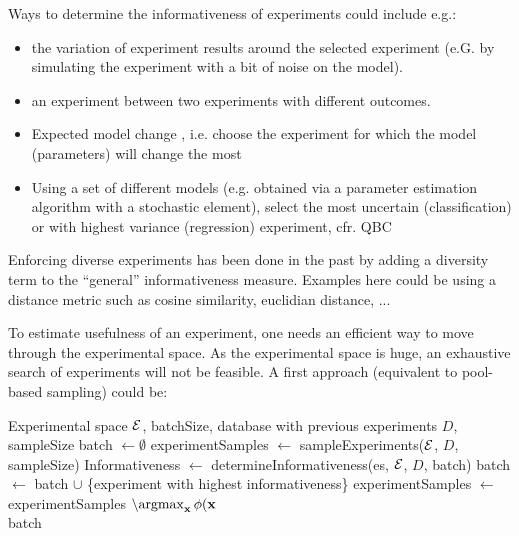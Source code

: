 \documentclass{article}
\begin{document}
Ways to determine the informativeness of experiments could include e.g.:
\begin{itemize}
\item the variation of experiment results around the selected experiment (e.G. by simulating the experiment with a bit of noise on the model).
\item an experiment between two experiments with different outcomes.
\item Expected model change \cite{cai2013maximizing}, i.e. choose the experiment for which the model (parameters) will change the most
\item Using a set of different models (e.g. obtained via a parameter estimation algorithm with a stochastic element), select the most uncertain (classification) or with highest variance (regression) experiment, cfr. QBC
\end{itemize}
Enforcing diverse experiments has been done in the past \cite{xu2007incorporating} by adding a diversity term to the ``general'' informativeness measure. Examples here could be using a distance metric such as cosine similarity, euclidian distance, ...
 
To estimate usefulness of an experiment, one needs an efficient way to 
move through the experimental space. As the experimental space is huge, an exhaustive search of experiments will not be feasible. A first approach (equivalent to pool-based sampling) could be:

\setlength{\textfloatsep}{10pt}%

\begin{algorithmic}
\Require Experimental space $\mathcal{E}$, batchSize, database with previous experiments $D$, sampleSize
\State batch $\leftarrow \emptyset$
\State experimentSamples $\leftarrow$ sampleExperiments($\mathcal{E}$, $D$, sampleSize)
     \State Informativeness $\leftarrow$ determineInformativeness(es, $\mathcal{E}$, $D$, batch)
   \EndFor
   \State batch $\leftarrow$ batch $\cup$ \{experiment with highest informativeness\}
   \State experimentSamples $\leftarrow$ experimentSamples $\setminus { \argmax_{\mathbf{x}} \phi(\mathbf{x} } $
   \EndWhile \\
   \Return batch
\EndFunction	
\end{algorithmic}
\end{document}
